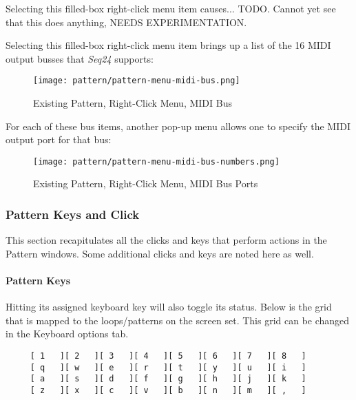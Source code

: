    Selecting this filled-box right-click menu item causes...
   TODO.  Cannot yet see that this does anything, NEEDS EXPERIMENTATION.

   Selecting this filled-box right-click menu item brings up a list
   of the 16 MIDI output busses that \textsl{Seq24} supports:

\begin{figure}[H]
   \centering 
   \texttt{[image: pattern/pattern-menu-midi-bus.png]}
   \caption{Existing Pattern, Right-Click Menu, MIDI Bus}
   \label{fig:pattern_window_right_click_midi_bus}
\end{figure}

   For each of these bus items, another pop-up menu allows one
   to specify the MIDI output port for that bus:

\begin{figure}[H]
   \centering 
   \texttt{[image: pattern/pattern-menu-midi-bus-numbers.png]}
   \caption{Existing Pattern, Right-Click Menu, MIDI Bus Ports}
   \label{fig:pattern_window_right_click_midi_bus_numbers}
\end{figure}

\subsubsection{Pattern Keys and Click}
\label{subsubsec:seq24_patterns_pattern_keys_and_clicks}

   This section recapitulates all the clicks and keys that perform actions
   in the Pattern windows.  Some additional clicks and keys are noted here
   as well.

\paragraph{Pattern Keys}
\label{paragraph:seq24_patterns_pattern_keys}

   Hitting its assigned keyboard key will
   also toggle its status.  Below is the grid that is
   mapped to the loops/patterns on the screen set.
   This grid can be changed in the Keyboard options tab.

   \begin{verbatim}
     [ 1   ][ 2   ][ 3   ][ 4   ][ 5   ][ 6   ][ 7   ][ 8   ]
     [ q   ][ w   ][ e   ][ r   ][ t   ][ y   ][ u   ][ i   ]
     [ a   ][ s   ][ d   ][ f   ][ g   ][ h   ][ j   ][ k   ]
     [ z   ][ x   ][ c   ][ v   ][ b   ][ n   ][ m   ][ ,   ]
   \end{verbatim}

